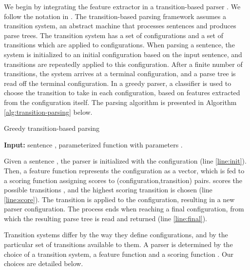 \documentclass[11pt]{article}
\begin{document}
We begin by integrating the feature extractor in a transition-based parser
\cite{nivre2008algorithms}. We follow the notation in
.
The transition-based parsing framework assumes a transition system, an abstract
machine that processes sentences and produces parse trees. The transition system
has a set of configurations and a set of transitions which are applied to
configurations. When parsing a sentence, the system is initialized to an initial
configuration based on the input sentence, and transitions are repeatedly
applied to this configuration. After a finite number of transitions, the system
arrives at a terminal configuration, and a parse tree is read off the terminal
configuration. In a greedy parser, a classifier is used to choose the transition
to take in each configuration, based on features extracted from the
configuration itself. The parsing algorithm is presented in Algorithm
\ref{alg:transition-parsing} below.

\begin{algorithm}[h]
   \caption{Greedy transition-based parsing}
   \label{alg:transition-parsing}
\begin{algorithmic}[1]
   \State \textbf{Input:} sentence , parameterized function
    with parameters .
   \State \label{line:init}
   \State \label{line:score}
   \State   
   \EndWhile
   \State \Return \label{line:final}
\end{algorithmic}
\end{algorithm}

Given a sentence , the parser is initialized with the configuration  (line
\ref{line:init}).
Then, a feature function  represents the configuration  as
a vector, which is fed to a scoring function  assigning
scores to (configuration,transition) pairs.  scores the
possible transitions , and the highest scoring transition  is chosen (line
\ref{line:score}).  The transition  is applied to the configuration,
resulting in a new parser configuration.  The process ends when reaching a final
configuration, from which the resulting parse tree is read and returned (line
\ref{line:final}).

Transition systems differ by the way they define configurations, and by the
particular set of transitions available to them.
A parser is determined by the choice of a transition system, a feature function  and a scoring
function .  Our choices are detailed below.
\end{document}
